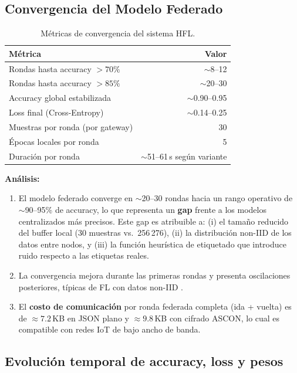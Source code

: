 \subsection{Convergencia del Modelo Federado}

\begin{table}[H]
\centering
\caption{Métricas de convergencia del sistema HFL.}
\label{tab:hfl_convergence}
\begin{tabular}{l r}
\toprule
\textbf{Métrica} & \textbf{Valor} \\
\midrule
Rondas hasta accuracy $> 70\%$  & $\sim$8--12 \\
Rondas hasta accuracy $> 85\%$  & $\sim$20--30 \\
Accuracy global estabilizada     & $\sim$0.90--0.95 \\
Loss final (Cross-Entropy)       & $\sim$0.14--0.25 \\
Muestras por ronda (por gateway) & 30 \\
Épocas locales por ronda         & 5 \\
Duración por ronda               & $\sim$51--61\,s según variante \\
\bottomrule
\end{tabular}
\end{table}

\textbf{Análisis:}
\begin{enumerate}[noitemsep, topsep=0pt]
    \item El modelo federado converge en $\sim$20--30 rondas hacia un rango operativo de $\sim$90--95\% de accuracy, lo que representa un \textbf{gap} frente a los modelos centralizados más precisos. Este gap es atribuible a: (i) el tamaño reducido del buffer local (30 muestras vs.\ 256\,276), (ii) la distribución non-IID de los datos entre nodos, y (iii) la función heurística de etiquetado que introduce ruido respecto a las etiquetas reales.

    \item La convergencia mejora durante las primeras rondas y presenta oscilaciones posteriores, típicas de FL con datos non-IID \cite{Imteaj2022_FL_ResourceConstrainedSurvey}.

    \item El \textbf{costo de comunicación} por ronda federada completa (ida + vuelta) es de $\approx 7.2$\,KB en JSON plano y $\approx 9.8$\,KB con cifrado ASCON, lo cual es compatible con redes IoT de bajo ancho de banda.
\end{enumerate}

\subsection{Evolución temporal de accuracy, loss y pesos}
\label{subsec:curvas_convergencia}

